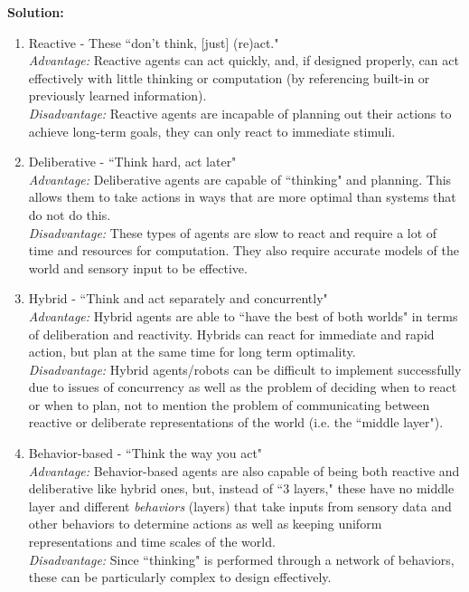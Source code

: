 \documentclass{article}
\begin{document}
\begin{enumerate}
\textbf{Solution:}
    \begin{enumerate}
    \item Reactive - These ``don't think, [just] (re)act." \\
    \textit{Advantage:} Reactive agents can act quickly, and, if designed 
                        properly, can act effectively with little thinking or computation (by referencing built-in or previously learned information). \\
    \textit{Disadvantage:} Reactive agents are incapable of planning out their
                           actions to achieve long-term goals, they can only react to immediate stimuli. \\

    \item Deliberative - ``Think hard, act later" \\
    \textit{Advantage:} Deliberative agents are capable of ``thinking" and
                        planning. This allows them to take actions in ways that are more optimal than systems that do not do this.
                        \\
    \textit{Disadvantage:} These types of agents are slow to react and require
                           a lot of time and resources for computation. They also require accurate models of the world and sensory input to be effective. \\

    \item Hybrid - ``Think and act separately and concurrently" \\
    \textit{Advantage:} Hybrid agents are able to ``have the best of both
                        worlds" in terms of deliberation and reactivity. Hybrids can react for immediate and rapid action, but plan at the same time for long term optimality. \\
    \textit{Disadvantage:} Hybrid agents/robots can be difficult to implement
                        successfully due to issues of concurrency as well as the problem of deciding when to react or when to plan, not to mention the problem of communicating between reactive or deliberate representations of the world (i.e. the ``middle layer"). \\

    \item Behavior-based - ``Think the way you act" \\
    \textit{Advantage:} Behavior-based agents are also capable of being both
                        reactive and deliberative like hybrid ones, but, instead of ``3 layers," these have no middle layer and different \textit{behaviors} (layers) that take inputs from sensory data and other behaviors to determine actions as well as keeping uniform representations and time scales of the world. \\
    \textit{Disadvantage:} Since ``thinking" is performed through a network
                           of behaviors, these can be particularly complex to design effectively. \newline \\
    \end{enumerate}



\end{enumerate}
\end{document}
